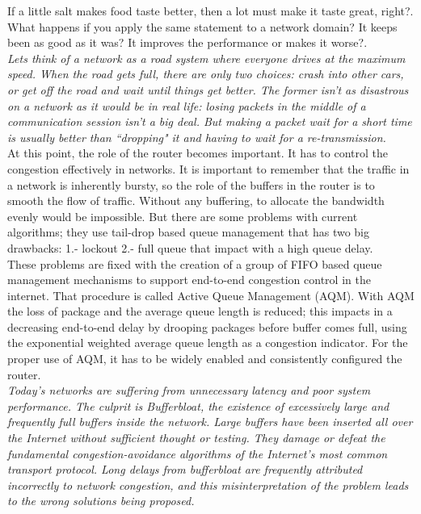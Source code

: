 If a little salt makes food taste better, then a lot must make it taste great, right?. What happens if you apply the same statement to a network domain? It keeps been as good as it was? It improves the performance or makes it worse?.\\

\textit{Lets think of a network as a road system where everyone drives at the maximum speed. When the road gets full, there are only two choices: crash into other cars, or get off the road and wait until things get better. The former isn't as disastrous on a network as it would be in real life: losing packets in the middle of a communication session isn't a big deal. But making a packet wait for a short time is usually better than ``dropping" it and having to wait for a re-transmission.}\cite{bufferarms}\\

At this point, the role of the router becomes important. It has to control the congestion effectively in networks. It is important to remember that the traffic in a network is inherently bursty, so the role of the buffers in the router is to smooth the flow of traffic. Without any buffering, to allocate the bandwidth evenly would be impossible. But there are some problems with current algorithms; they use tail-drop based queue management that has two big drawbacks: 1.- lockout 2.- full queue that impact with a high queue delay.\\

These problems are fixed with the creation of a group of FIFO based queue management mechanisms to support end-to-end congestion control in the internet. That procedure is called Active Queue Management (AQM). With AQM the loss of package and the average queue length is reduced; this impacts in a decreasing end-to-end delay by drooping packages before buffer comes full, using the exponential weighted average queue length as a congestion indicator. For the proper use of AQM, it has to be widely enabled and consistently configured the router.\\

\textit{Today's networks are suffering from unnecessary latency and poor system performance. The culprit is Bufferbloat, the existence of excessively large and frequently full buffers inside the network. Large buffers have been inserted all over the Internet without sufficient thought or testing. They damage or defeat the fundamental congestion-avoidance algorithms of the Internet's most common transport protocol. Long delays from bufferbloat are frequently attributed incorrectly to network congestion, and this misinterpretation of the problem leads to the wrong solutions being proposed.}\cite{GettysNichols}\\

